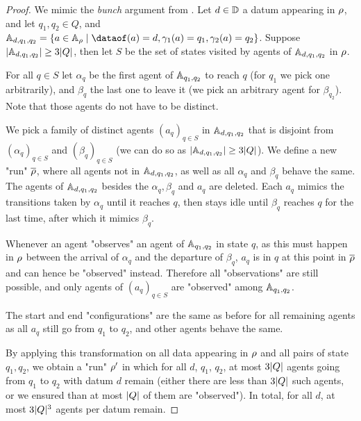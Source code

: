 \begin{proof}
	We mimic the \emph{bunch} argument from \cite{EsparzaRW2019}. 
	Let $d\in \mathbb{D}$ a datum appearing in $\rho$, and let $q_1, q_2 \in Q$, and $\Agentset_{d, q_1, q_2} = \set{a \in \Agentset_{\run} \mid \dataof(a) = d, \config_1(a) = q_1, \config_2(a) = q_2}$. Suppose $|\mathbb{A}_{d, q_1, q_2}| \geq 3|Q|$, then let $S$ be the set of states visited by agents of $\mathbb{A}_{d, q_1, q_2}$ in $\rho$.
	
	For all $q \in S$ let $\alpha_q$ be the first agent of $\mathbb{A}_{q_1, q_2}$ to reach $q$ (for $q_1$ we pick one arbitrarily), and $\beta_q$ the last one to leave it (we pick an arbitrary agent for $\beta_{q_2}$). 
	Note that those agents do not have to be distinct.
	
	We pick a family of distinct agents $(a_q)_{q \in S}$ in $\mathbb{A}_{d, q_1, q_2}$ that is disjoint from $(\alpha_q)_{q \in S}$ and $(\beta_q)_{q \in S}$ (we can do so as $|\mathbb{A}_{d, q_1, q_2}| \geq 3|Q|$).
	We define a new "run" $\overline{\rho}$, where all agents not in $\mathbb{A}_{d, q_1, q_2}$, as well as all $\alpha_q$ and $\beta_q$ behave the same. The agents of $\mathbb{A}_{d, q_1, q_2}$ besides the $\alpha_q, \beta_q$ and $a_q$ are deleted.
	Each $a_q$ mimics the transitions taken by $\alpha_q$ until it reaches $q$, then stays idle until $\beta_q$ reaches $q$ for the last time, after which it mimics $\beta_q$. 
	
	Whenever an agent "observes" an agent of $\mathbb{A}_{q_1, q_2}$ in state $q$, as this must happen in $\rho$ between the arrival of $\alpha_q$ and the departure of $\beta_q$, $a_q$ is in $q$ at this point in $\overline{\rho}$ and can hence be "observed" instead. Therefore all "observations" are still possible, and only agents of $(a_{q})_{q\in S}$ are "observed" among $\mathbb{A}_{q_1, q_2}$.
	
	The start and end "configurations" are the same as before for all remaining agents as all $a_q$ still go from $q_1$ to $q_2$, and other agents behave the same.
	
	By applying this transformation on all data appearing in $\rho$ and all pairs of state $q_1, q_2$, we obtain a "run" $\rho'$ in which for all $d$, $q_1$, $q_2$, at most $3|Q|$ agents going from $q_1$ to $q_2$ with datum $d$ remain (either there are less than $3|Q|$ such agents, or we ensured than at most $|Q|$ of them are "observed").
	In total, for all $d$, at most $3|Q|^3$ agents per datum remain.
\end{proof}



